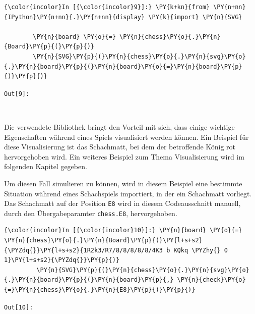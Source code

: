     \begin{Verbatim}[commandchars=\\\{\}]
{\color{incolor}In [{\color{incolor}9}]:} \PY{k+kn}{from} \PY{n+nn}{IPython}\PY{n+nn}{.}\PY{n+nn}{display} \PY{k}{import} \PY{n}{SVG}
        
        \PY{n}{board} \PY{o}{=} \PY{n}{chess}\PY{o}{.}\PY{n}{Board}\PY{p}{(}\PY{p}{)}
        \PY{n}{SVG}\PY{p}{(}\PY{n}{chess}\PY{o}{.}\PY{n}{svg}\PY{o}{.}\PY{n}{board}\PY{p}{(}\PY{n}{board}\PY{o}{=}\PY{n}{board}\PY{p}{)}\PY{p}{)} 
\end{Verbatim}

\texttt{\color{outcolor}Out[{\color{outcolor}9}]:}
    
    \begin{center}
    \end{center}
    { \hspace*{\fill} \\}
    

    Die verwendete Bibliothek bringt den Vorteil mit sich, dass einige
wichtige Eigenschaften während eines Spiels visualisiert werden können.
Ein Beispiel für diese Visualisierung ist das Schachmatt, bei dem der
betroffende König rot hervorgehoben wird. Ein weiteres Beispiel zum
Thema Visualisierung wird im folgenden Kapitel gegeben.

Um diesen Fall simulieren zu können, wird in diesem Beispiel eine
bestimmte Situation während eines Schachspiels importiert, in der ein
Schachmatt vorliegt. Das Schachmatt auf der Position \texttt{E8} wird in
diesem Codeausschnitt manuell, durch den Übergabeparamter
\texttt{chess.E8}, hervorgehoben.

    \begin{Verbatim}[commandchars=\\\{\}]
{\color{incolor}In [{\color{incolor}10}]:} \PY{n}{board} \PY{o}{=} \PY{n}{chess}\PY{o}{.}\PY{n}{Board}\PY{p}{(}\PY{l+s+s2}{\PYZdq{}}\PY{l+s+s2}{1R2k3/R7/8/8/8/8/8/4K3 b KQkq \PYZhy{} 0 1}\PY{l+s+s2}{\PYZdq{}}\PY{p}{)}
         \PY{n}{SVG}\PY{p}{(}\PY{n}{chess}\PY{o}{.}\PY{n}{svg}\PY{o}{.}\PY{n}{board}\PY{p}{(}\PY{n}{board}\PY{p}{,} \PY{n}{check}\PY{o}{=}\PY{n}{chess}\PY{o}{.}\PY{n}{E8}\PY{p}{)}\PY{p}{)}
\end{Verbatim}

\texttt{\color{outcolor}Out[{\color{outcolor}10}]:}
    
    \begin{center}
    \end{center}
    { \hspace*{\fill} \\}
    


